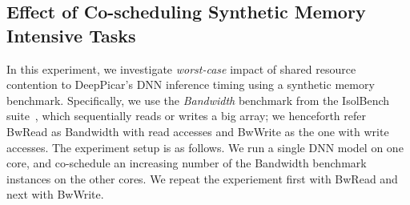 
\subsection{Effect of Co-scheduling Synthetic Memory Intensive Tasks}\label{sec:eval-memhog}

In this experiment, we investigate \emph{worst-case} impact of shared 
resource contention to DeepPicar's DNN inference timing using  
a synthetic memory benchmark. Specifically, we use the \emph{Bandwidth}
benchmark from the IsolBench suite~\cite{Valsan2016}, which
sequentially reads or writes a big array; we henceforth refer BwRead 
as Bandwidth with read accesses and BwWrite as the one with write
accesses. The experiment setup is as follows. We run a single DNN
model on one core, and co-schedule an increasing number of the
Bandwidth benchmark instances on the other cores. We repeat the
experiement first with BwRead and next with BwWrite.

  
